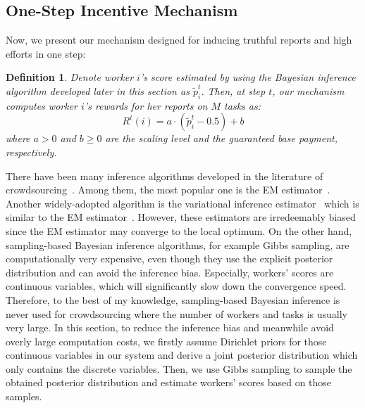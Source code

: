 \documentclass{article}
\newtheorem{definition}{Definition}
\begin{document}
\subsection{One-Step Incentive Mechanism}
Now, we present our mechanism designed for inducing truthful reports and high efforts in one step:
\begin{definition}
\label{MechDef}
Denote worker $i$'s score estimated by using the Bayesian inference algorithm developed later in this section as $\tilde{p}^{t}_i$. Then, at step $t$, our mechanism computes worker $i$'s rewards for her reports on $M$ tasks as:
\begin{equation}
R^t(i)=a\cdot (\tilde{p}^{t}_i - 0.5)+b
\end{equation}
where $a>0$ and $b\geq 0$ are the scaling level and the guaranteed base payment, respectively.
\end{definition}
There have been many inference algorithms developed in the literature of crowdsourcing~\cite{zheng2017truth}. Among them, the most popular one is the EM estimator~\cite{dawid1979maximum}. Another widely-adopted algorithm is the variational inference estimator~\cite{liu2012variational} which is similar to the EM estimator~\cite{tzikas2008variational}.
However, these estimators are irredeemably biased since the EM estimator may converge to the local optimum.
On the other hand, sampling-based Bayesian inference algorithms, for example Gibbs sampling, are computationally very expensive, even though they use the explicit posterior distribution and can avoid the inference bias.
Especially, workers' scores are continuous variables, which will significantly slow down the convergence speed.
Therefore, to the best of my knowledge, sampling-based Bayesian inference is never used for crowdsourcing where the number of workers and tasks is usually very large.
In this section, to reduce the inference bias and meanwhile avoid overly large computation costs, we firstly assume Dirichlet priors for those continuous variables in our system and derive a joint posterior distribution which only contains the discrete variables.
Then, we use Gibbs sampling to sample the obtained posterior distribution and estimate workers' scores based on those samples.
\end{document}
